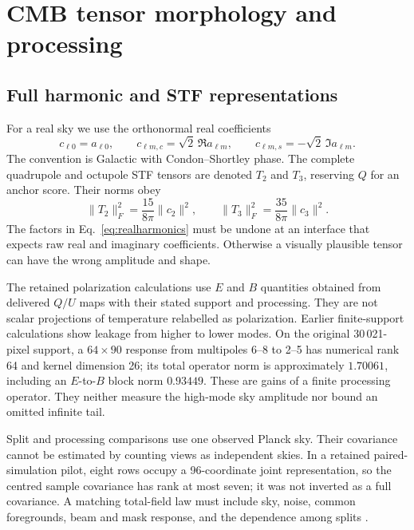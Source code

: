 \section{CMB tensor morphology and processing}
\label{sec:cmb}

\subsection{Full harmonic and STF representations}

For a real sky we use the orthonormal real coefficients
\begin{equation}
 c_{\ell0}=a_{\ell0},\qquad
 c_{\ell m,c}=\sqrt2\,\Re a_{\ell m},\qquad
 c_{\ell m,s}=-\sqrt2\,\Im a_{\ell m}.
 \label{eq:realharmonics}
\end{equation}
The convention is Galactic with Condon--Shortley phase. The complete quadrupole and octupole STF tensors are denoted $T_2$ and $T_3$, reserving $Q$ for an anchor score. Their norms obey
\begin{equation}
 \|T_2\|_F^2=\frac{15}{8\pi}\|c_2\|^2,
 \qquad \|T_3\|_F^2=\frac{35}{8\pi}\|c_3\|^2.
\end{equation}
The factors in Eq.~\eqref{eq:realharmonics} must be undone at an interface that expects raw real and imaginary coefficients. Otherwise a visually plausible tensor can have the wrong amplitude and shape.

The retained polarization calculations use $E$ and $B$ quantities obtained from delivered $Q/U$ maps with their stated support and processing. They are not scalar projections of temperature relabelled as polarization. Earlier finite-support calculations show leakage from higher to lower modes. On the original 30\,021-pixel support, a $64\times90$ response from multipoles 6--8 to 2--5 has numerical rank 64 and kernel dimension 26; its total operator norm is approximately $1.70061$, including an $E$-to-$B$ block norm $0.93449$. These are gains of a finite processing operator. They neither measure the high-mode sky amplitude nor bound an omitted infinite tail.

Split and processing comparisons use one observed Planck sky. Their covariance cannot be estimated by counting views as independent skies. In a retained paired-simulation pilot, eight rows occupy a 96-coordinate joint representation, so the centred sample covariance has rank at most seven; it was not inverted as a full covariance. A matching total-field law must include sky, noise, common foregrounds, beam and mask response, and the dependence among splits \cite{Planck2018IV,Planck2018VII,SheehySlosar2018}.

